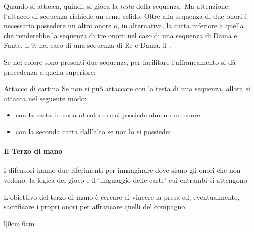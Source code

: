 \documentclass[../corsofiori.tex]{subfiles}
\begin{document}
Quando si attacca, quindi, si gioca la \emph{testa} della sequenza. Ma attenzione: l'attacco di sequenza richiede un
seme solido. Oltre alla sequenza di due onori è necessario possedere un altro onore o, in alternativa, la carta
inferiore a quella che renderebbe la sequenza di tre onori: nel caso di una sequenza di Dama e Fante, il 9; nel caso di
una sequenza di Re e Dama, il \Ten.

Se nel colore sono presenti due sequenze, per facilitare l'affrancamento si dà precedenza a quella superiore:

\qquad{}

\medskip
\begin{regola}{Attacco di cartina}
    Se non si può attaccare con la testa di una sequenza, allora si attacca nel seguente modo:
\begin{itemize}
    \item con la carta in coda al colore se si possiede almeno un onore:

        \qquad
        \qquad

    \item con la seconda carta dall'alto se non lo si possiede:

        \qquad
\end{itemize}
\end{regola}

\paragraph{Il Terzo di mano} I difensori hanno due riferimenti per immaginare dove siano gli onori che non vedono: la
logica del gioco e il `linguaggio delle carte' cui entrambi si attengono.

L'obiettivo del terzo di mano è cercare di vincere la presa ed, eventualmente, sacrificare i propri onori per affrancare
quelli del compagno.

\begin{wraptable}[6]{l}[0cm]{6cm}

    \vspace{-.5cm}

    \hspace{1cm}

    \bigskip

    \hspace{1.375cm}
\end{wraptable}
\bigskip
\end{document}

